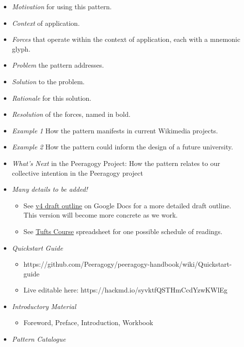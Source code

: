 \begin{itemize}
\item
  \emph{Motivation} for using this pattern.
\item
  \emph{Context} of application.
\item
  \emph{Forces} that operate within the context of application, each
  with a mnemonic glyph.
\item
  \emph{Problem} the pattern addresses.
\item
  \emph{Solution} to the problem.
\item
  \emph{Rationale} for this solution.
\item
  \emph{Resolution} of the forces, named in bold.
\item
  \emph{Example 1} How the pattern manifests in current Wikimedia
  projects.
\item
  \emph{Example 2} How the pattern could inform the design of a future
  university.
\item
  \emph{What's Next} in the Peeragogy Project: How the pattern relates
  to our collective intention in the Peeragogy project
\item
  \emph{Many details to be added!}

  \begin{itemize}
  \tightlist
  \item
    See
    \href{https://docs.google.com/document/d/1v2TxWlYKqXuD2USl1Sb1OzCknZzTHjli1QCn7RrAQek/edit}{v4
    draft outline} on Google Docs for a more detailed draft outline.
    This version will become more concrete as we work.
  \item
    See
    \href{https://docs.google.com/spreadsheets/d/1pUlzk5uRYHdQmcM1pmllNKhvr21NH-ZXeZf2QJOyobw/edit\#gid=0}{Tufts
    Course} spreadsheet for one possible schedule of readings.
  \end{itemize}
\item
  \emph{Quickstart Guide}

  \begin{itemize}
  \tightlist
  \item
    https://github.com/Peeragogy/peeragogy-handbook/wiki/Quickstart-guide
  \item
    Live editable here: https://hackmd.io/syvktfQSTHmCcdYzwKWlEg
  \end{itemize}
\item
  \emph{Introductory Material}

  \begin{itemize}
  \tightlist
  \item
    Foreword, Preface, Introduction, Workbook
  \end{itemize}
\item
  \emph{Pattern Catalogue}
\end{itemize}

